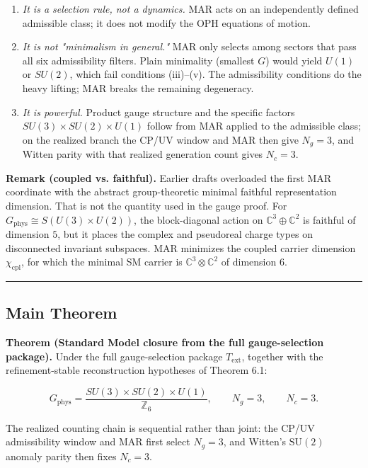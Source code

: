 \begin{enumerate}
\def\labelenumi{\arabic{enumi}.}
\item
  \emph{It is a selection rule, not a dynamics.} MAR acts on an independently defined admissible class; it does not modify the OPH equations of motion.
\item
  \emph{It is not "minimalism in general."} MAR only selects among sectors that pass all six admissibility filters. Plain minimality (smallest \(G\)) would yield \(U(1)\) or \(SU(2)\), which fail conditions (iii)--(v). The admissibility conditions do the heavy lifting; MAR breaks the remaining degeneracy.
\item
  \emph{It is powerful.} Product gauge structure and the specific factors \(SU(3) \times SU(2) \times U(1)\) follow from MAR applied to the admissible class; on the realized branch the CP/UV window and MAR then give \(N_g = 3\), and Witten parity with that realized generation count gives \(N_c = 3\).
\end{enumerate}

\textbf{Remark (coupled vs. faithful).} Earlier drafts overloaded the first MAR coordinate with the abstract group-theoretic minimal faithful representation dimension. That is not the quantity used in the gauge proof. For \(G_{\mathrm{phys}} \cong S(U(3) \times U(2))\), the block-diagonal action on \(\mathbb{C}^3 \oplus \mathbb{C}^2\) is faithful of dimension \(5\), but it places the complex and pseudoreal charge types on disconnected invariant subspaces. MAR minimizes the coupled carrier dimension \(\chi_{\mathrm{cpl}}\), for which the minimal SM carrier is \(\mathbb{C}^3 \otimes \mathbb{C}^2\) of dimension \(6\).

\begin{center}\rule{0.5\linewidth}{0.5pt}\end{center}

\subsection{Main Theorem}\label{4-main-theorem}

\textbf{Theorem (Standard Model closure from the full gauge-selection package).} Under the full gauge-selection package \(T_{\mathrm{ext}}\), together with the refinement-stable reconstruction hypotheses of Theorem 6.1:

\[G_{\mathrm{phys}} = \frac{SU(3) \times SU(2) \times U(1)}{\mathbb{Z}_6}, \qquad N_g = 3, \qquad N_c = 3.\]

The realized counting chain is sequential rather than joint: the CP/UV admissibility window and MAR first select \(N_g = 3\), and Witten's \(\mathrm{SU}(2)\) anomaly parity then fixes \(N_c = 3\).

